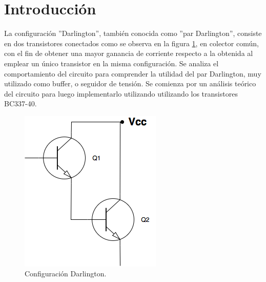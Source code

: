 \section{Introducci\'on}

La configuraci\'on ''Darlington'', tambi\'en conocida como ''par Darlington'', consiste en dos transistores conectados como se observa en la figura \ref{darlington_ideal}, en colector común, con el fin de obtener una mayor ganancia de corriente respecto a la obtenida al emplear un \'unico transistor en la misma configuración. Se analiza el comportamiento del circuito para comprender la utilidad del par Darlington, muy utilizado como buffer, o seguidor de tensión. Se comienza por un an\'alisis te\'orico del circuito para luego implementarlo utilizando utilizando los transistores BC337-40.

\begin{figure}[H]
	\centering
		\includegraphics[scale=0.4]{./Imagenes/darlington_ideal.png} 
	\caption{Configuraci\'on Darlington.}
	\label{darlington_ideal}
\end{figure}
